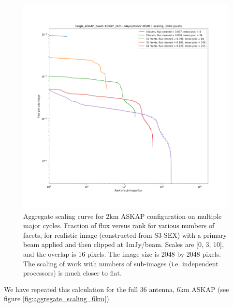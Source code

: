 \documentclass[11pt,a4paper,variablewidth]{article}
\begin{document}
\begin{figure}[H]
  \centering
  \includegraphics[width=\textwidth]{./pngs/aggregate_scaling_single_ASKAP_beam_ASKAP_2km_2048.png}
  \caption{Aggregate scaling curve for 2km ASKAP configuration on multiple major cycles. Fraction of flux versus rank for various numbers of facets, for realistic image (constructed from S3-SEX) with a primary beam applied and then clipped at 1mJy/beam. Scales are [0, 3, 10], and the overlap is 16 pixels. The image size is 2048 by 2048 pixels. The scaling of work with numbers of sub-images (i.e. independent processors) is much closer to flat.}
  \label{fig:aggregate_scaling_2km}
\end{figure}

We have repeated this calculation for the full 36 antenna, 6km ASKAP (see figure \ref{fig:aggregate_scaling_6km}). 
\end{document}
